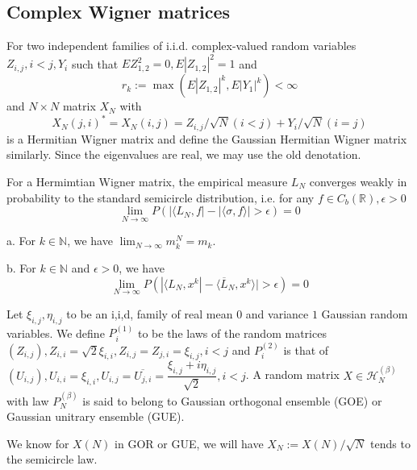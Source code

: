\documentclass[lang=en, color=blue, ]{elegantbook}
\newcommand{\R}{\mathbb{R}}
\newcommand{\N}{\mathbb{N}}
\newcommand{\EL}{\overline{L}}
\newcommand{\Hil}{\mathcal{H}}
\begin{document}
\section{Complex Wigner matrices}

\begin{definition}
    For two independent families of i.i.d. complex-valued random variables $Z_{i,j}, i<j, Y_i$ such that $EZ_{1,2}^2 = 0, E|Z_{1,2}|^2 = 1$ and
    \[r_k := \max(E|Z_{1,2}|^k,E|Y_1|^k) < \infty\]
    and $N\times N$ matrix $X_N$ with
    \[X_N(j,i)^* = X_N(i,j) = Z_{i,j}/\sqrt{N}(i<j) + Y_i/\sqrt{N}(i=j)\]
    is a Hermitian Wigner matrix and define the Gaussian Hermitian Wigner matrix similarly. Since the eigenvalues are real, we may use the old denotation.
\end{definition}

\begin{theorem}
    For a Hermimtian Wigner matrix, the empirical measure $L_N$ converges weakly in probability to the standard semicircle distribution, i.e. for any $f\in C_b(\R),\epsilon > 0$
    \[
    \lim_{N\to\infty}P(|\langle L_N,f|-|\langle \sigma,f\rangle| > \epsilon) = 0
    \]
\end{theorem}

\begin{lemma}
    a. For $k\in \N$, we have $\lim_{N\to\infty} m_k^N = m_k$.\par
    b. For $k\in \N$ and $\epsilon > 0$, we have
    \[\lim_{N\to\infty} P(|\langle L_N, x^k| - \langle \EL_N,x^k\rangle | > \epsilon) = 0\]
\end{lemma}

\begin{definition}
    Let $\xi_{i,j},\eta_{i,j}$ to be an i,i,d, family of real mean $0$ and variance $1$ Gaussian random variables. We define $P_i^{(1)}$ to be the laws of the random matrices $(Z_{i,j}), Z_{i,i} = \sqrt{2}\xi_{i,i}, Z_{i,j} = Z_{j,i} = \xi_{i,j}, i<j$ and $P_i^{(2)}$ is that of $(U_{i,j}), U_{i,i} = \xi_{i,i}, U_{i,j} = \overline{U_{j,i}} = \dfrac{\xi_{i,j}+i\eta_{i,j}}{\sqrt{2}}, i<j$. A random matrix $X\in \Hil_N^{(\beta)}$ with law $P_N^{(\beta)}$ is said to belong to Gaussian orthogonal ensemble (GOE) or Gaussian unitrary ensemble (GUE).
\end{definition}

We know for $X(N)$ in GOR or GUE, we will have $X_N := X(N)/\sqrt{N}$ tends to the semicircle law.

\chapter{}
\end{document}
